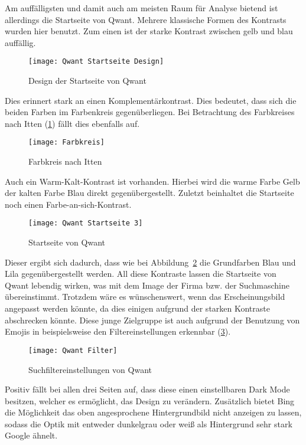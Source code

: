 Am auffälligsten und damit auch am meisten Raum für Analyse bietend ist allerdings die Startseite von Qwant. Mehrere
klassische Formen des Kontrasts wurden hier benutzt. Zum einen ist der starke Kontrast zwischen gelb und blau auffällig.
\begin{figure}[h]
    \centering
    \texttt{[image: Qwant Startseite Design]}
    \caption{Design der Startseite von Qwant}
\end{figure}
Dies erinnert stark an einen Komplementärkontrast. Dies bedeutet, dass sich die beiden Farben im Farbenkreis gegenüberliegen\autocite[Seite 33]{Maulhardt.20220513}.
Bei Betrachtung des Farbkreises nach Itten (\ref{fig:farbkreis}) fällt dies ebenfalls auf.
\begin{figure}[h]
    \centering
    \texttt{[image: Farbkreis]}
    \caption{Farbkreis nach Itten\autocite{Farbkreis}}
    \label{fig:farbkreis}
\end{figure}
Auch ein
Warm-Kalt-Kontrast ist vorhanden. Hierbei wird die warme Farbe Gelb der kalten Farbe Blau direkt gegenübergestellt\autocite[Seite 34]{Maulhardt.20220513}.
Zuletzt beinhaltet die Startseite noch einen Farbe-an-sich-Kontrast.
\begin{figure}[h]
    \centering
    \texttt{[image: Qwant Startseite 3]}
    \caption{Startseite von Qwant}
    \label{fig:qwantstartseite3}
\end{figure}
Dieser ergibt sich dadurch,
dass wie bei Abbildung~\ref{fig:qwantstartseite3} die Grundfarben Blau und Lila gegenübergestellt werden\autocite[Seite 38]{Maulhardt.20220513}. All diese Kontraste
lassen die Startseite von Qwant lebendig wirken, was mit dem Image der Firma bzw. der Suchmaschine übereinstimmt.
Trotzdem wäre es wünschenswert, wenn das Erscheinungsbild angepasst werden könnte, da dies einigen aufgrund der starken
Kontraste abschrecken könnte. Diese junge Zielgruppe ist auch aufgrund der Benutzung von Emojis in beispielsweise den
Filtereinstellungen erkennbar (\ref{fig:qwantfilter}).
\begin{figure}[h]
    \centering
    \texttt{[image: Qwant Filter]}
    \caption{Suchfiltereinstellungen von Qwant}
    \label{fig:qwantfilter}
\end{figure}

Positiv fällt bei allen drei Seiten auf, dass diese einen einstellbaren Dark Mode besitzen, welcher es ermöglicht, das
Design zu verändern. Zusätzlich bietet Bing die Möglichkeit das oben angesprochene Hintergrundbild nicht anzeigen zu lassen,
sodass die Optik mit entweder dunkelgrau oder weiß als Hintergrund sehr stark Google ähnelt.

